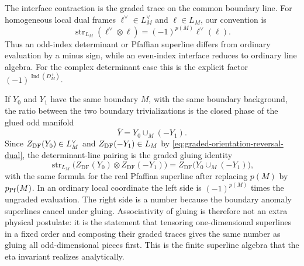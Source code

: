 The interface contraction is the graded trace on the common boundary line.
For homogeneous local dual frames \(\ell^\vee\in L_M^\vee\) and
\(\ell\in L_M\), our convention is
\begin{equation}
  \operatorname{str}_{L_M}(\ell^\vee\otimes\ell)
  =
  (-1)^{p(M)}\ell^\vee(\ell).
  \label{eq:dai-freed-supertrace-interface}
\end{equation}
Thus an odd-index determinant or Pfaffian superline differs from ordinary
evaluation by a minus sign, while an even-index interface reduces to ordinary
line algebra.  For the complex determinant case this is the explicit factor
\((-1)^{\operatorname{Ind}(D_M^+)}\).

If \(Y_0\) and \(Y_1\) have the same boundary \(M\), with the same boundary
background, the ratio between the two boundary trivializations is the closed
phase of the glued odd manifold
\[
  \overline Y
  =
  Y_0\cup_M(-Y_1).
\]
Since \(Z_{\rm DF}(Y_0)\in L_M^\vee\) and
\(Z_{\rm DF}(-Y_1)\in L_M\) by
\eqref{eq:graded-orientation-reversal-dual}, the determinant-line pairing is
the graded gluing identity
\begin{equation}
  \operatorname{str}_{L_M}
  \bigl(Z_{\mathrm{DF}}(Y_0)\otimes Z_{\mathrm{DF}}(-Y_1)\bigr)
  =
  Z_{\mathrm{DF}}\bigl(Y_0\cup_M(-Y_1)\bigr),
  \label{eq:dai-freed-boundary-gluing-law}
\end{equation}
with the same formula for the real Pfaffian superline after replacing
\(p(M)\) by \(p_{\rm Pf}(M)\).  In an ordinary local coordinate the left side
is \((-1)^{p(M)}\) times the ungraded evaluation.  The right side is a number
because the boundary anomaly superlines cancel under gluing.  Associativity
of gluing is therefore not an extra physical postulate: it is the statement
that tensoring one-dimensional superlines in a fixed order and composing
their graded traces gives the same number as gluing all odd-dimensional
pieces first.  This is the finite superline algebra that the eta invariant
realizes analytically.


